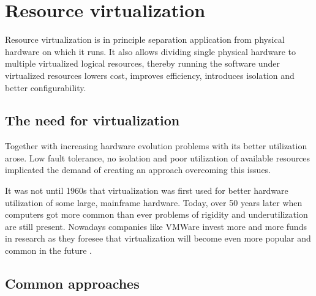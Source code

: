 \documentclass[11pt,openany]{book}
\begin{document}



    \section{Resource virtualization}
    \label{sec:ctx:virt}

      Resource virtualization is  in principle separation application from
      physical hardware on which it runs. It also allows dividing single physical hardware to multiple virtualized
      logical resources, thereby running the software under virtualized resources lowers cost, improves efficiency,
      introduces isolation and better configurability. 


      \subsection{The need for virtualization}

        Together with increasing hardware evolution problems with its better utilization arose. Low fault tolerance, no
        isolation and poor utilization of available resources implicated the demand of creating an approach overcoming
        this issues. 

        It was not until 1960s that virtualization was first used for better hardware utilization of some large,
        mainframe hardware. Today, over 50 years later when computers got more common than ever problems of rigidity and
        underutilization are still present. Nowadays companies like VMWare invest more and more funds in research as
        they foresee that virtualization will become even more popular and common in the future \cite{virtualization}.



      \subsection{Common approaches}
\end{document}
